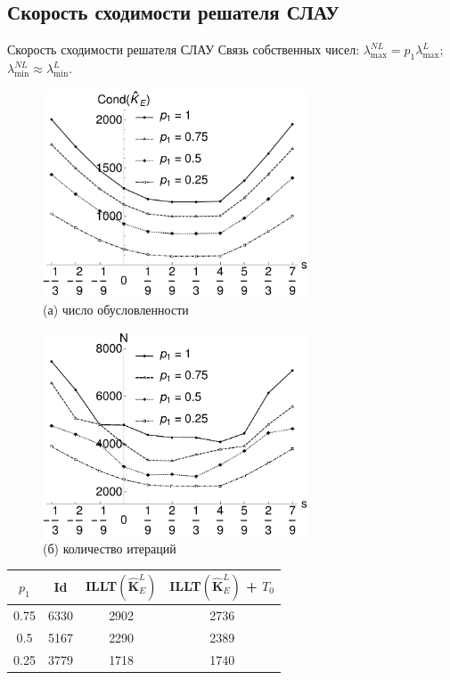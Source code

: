 \subsection{Скорость сходимости решателя СЛАУ}
\begin{frame}{Скорость сходимости решателя СЛАУ}
Связь собственных чисел:
$\lambda_{\max}^{NL} = p_1 \lambda_{\max}^{L}$;
$\lambda_{\min}^{NL} \approx \lambda_{\min}^{L}$.

\begin{figure}[h]
	\begin{minipage}{0.49\textwidth}
		\centering
		\includegraphics[width=0.7\textwidth]{pics/MechanicalCond.pdf} \\
		(а) число обусловленности
	\end{minipage}
	\begin{minipage}{0.5\textwidth}
		\centering
		\includegraphics[width=0.7\textwidth]{pics/MechanicalIter.pdf} \\
		(б) количество итераций
	\end{minipage}
	\label{fig:ThermalCondAndIter}
\end{figure}

\begin{center}
\begin{tabular}{|c|c|c|c|}
	\hline
	$p_1$ & Id & ILLT$\left( \widehat{\textbf{K}}^L_E \right)$ & ILLT$\left( \widehat{\textbf{K}}^L_E \right)$ + $T_0$ \\
	\hline
	0.75 & 6330 & 2902 & 2736 \\
	0.5  & 5167 & 2290 & 2389 \\
	0.25 & 3779 & 1718 & 1740 \\
	\hline
\end{tabular}
\end{center}


\end{frame}
